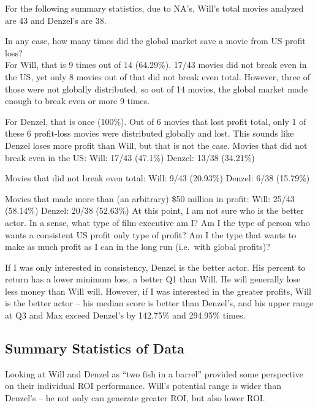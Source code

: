 \documentclass[]{article}
\begin{document}
For the following summary statistics, due to NA's, Will's total movies
analyzed are 43 and Denzel's are 38.

In any case, how many times did the global market save a movie from US
profit loss?\\
\vspace{5mm} For Will, that is 9 times out of 14 (64.29\%). 17/43 movies
did not break even in the US, yet only 8 movies out of that did not
break even total. However, three of those were not globally distributed,
so out of 14 movies, the global market made enough to break even or more
9 times.

For Denzel, that is once (100\%). Out of 6 movies that lost profit
total, only 1 of these 6 profit-loss movies were distributed globally
and lost. This sounds like Denzel loses more profit than Will, but that
is not the case. \vspace{5mm} Movies that did not break even in the US:
Will: 17/43 (47.1\%) Denzel: 13/38 (34.21\%)

Movies that did not break even total: Will: 9/43 (20.93\%) Denzel: 6/38
(15.79\%)

Movies that made more than (an arbitrary) \$50 million in profit: Will:
25/43 (58.14\%) Denzel: 20/38 (52.63\%) \vspace{5mm} At this point, I am
not sure who is the better actor. In a sense, what type of film
executive am I? Am I the type of person who wants a consistent US profit
only type of profit? Am I the type that wants to make as much profit as
I can in the long run (i.e.~with global profits)?

If I was only interested in consistency, Denzel is the better actor. His
percent to return has a lower minimum loss, a better Q1 than Will. He
will generally lose less money than Will will. However, if I was
interested in the greater profits, Will is the better actor -- his
median score is better than Denzel's, and his upper range at Q3 and Max
exceed Denzel's by 142.75\% and 294.95\% times.

\subsection{Summary Statistics of Data}
\label{sec:data-summary}

Looking at Will and Denzel as \enquote{two fish in a barrel} provided
some perspective on their individual ROI performance. Will's potential
range is wider than Denzel's -- he not only can generate greater ROI,
but also lower ROI.
\end{document}

